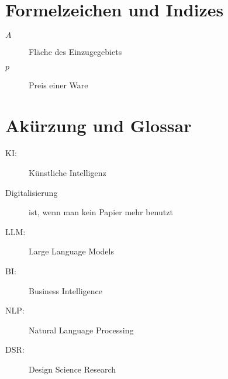 
\section *{Formelzeichen und Indizes} %

\begin{description}
\item[$A$] Fläche des Einzugegebiets
\item[$p$] Preis einer Ware
\end{description}

\section *{Akürzung und Glossar}
\begin{description}
\item[KI:] Künstliche Intelligenz
\item[Digitalisierung] ist, wenn man kein Papier mehr benutzt
\item[LLM:] Large Language Models
\item[BI:] Business Intelligence
\item[NLP:] Natural Language Processing
\item[DSR:] Design Science Research
\end{description}
